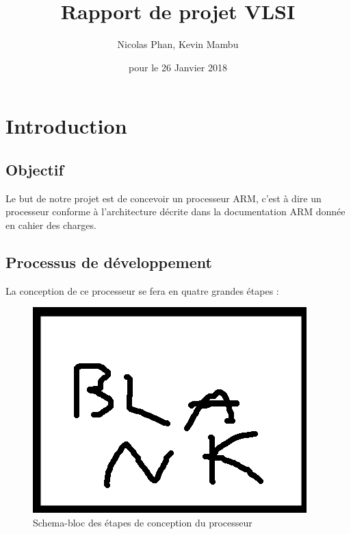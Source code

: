 \documentclass{report}
\title{Rapport de projet VLSI}
\author{Nicolas Phan, Kevin Mambu}
\date{pour le 26 Janvier 2018}
\begin{document}
\pagestyle{headings}
\maketitle
\tableofcontents

\section{Introduction}

\subsection{Objectif}

Le but de notre projet est de concevoir un processeur ARM, c'est à dire un processeur conforme
à l'architecture décrite dans la documentation ARM donnée en cahier des charges.

\subsection{Processus de développement}

La conception de ce processeur se fera en quatre grandes étapes :

\begin{figure}[h]
\includegraphics[scale=1]{pics/blank.png}
\centering
\caption{Schema-bloc des étapes de conception du processeur} 
\end{figure}
\end{document}
